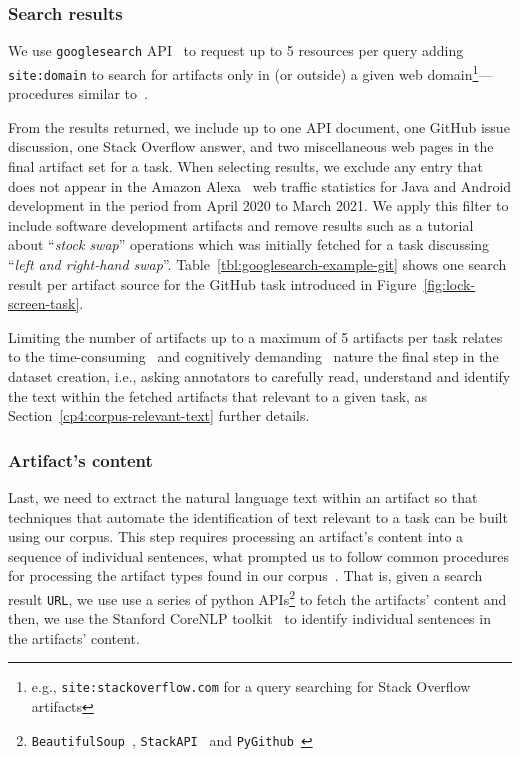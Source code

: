 \subsubsection{Search results}


We use \texttt{googlesearch} API~\cite{googlesearch} to 
request up to 5 resources per query
adding \texttt{site:domain} to search for artifacts 
only in (or outside) a given web domain\footnote{e.g., \texttt{site:stackoverflow.com} for a query searching for Stack Overflow artifacts}---procedures similar to~\cite{Xu2017}.



From the results returned, we include up to
one API document, one GitHub issue discussion, one Stack Overflow answer, and two miscellaneous web pages
in the final artifact set for a task. 
When selecting results, we exclude any entry that does not appear in the Amazon Alexa~\cite{alexa} web traffic statistics for Java and Android development in the period from April 2020 to March 2021. 
We apply this filter to include software development artifacts and remove results 
such as a tutorial about  ``\textit{stock swap}'' operations which was initially fetched 
for a task discussing ``\textit{left and right-hand swap}''.
Table~\ref{tbl:googlesearch-example-git} shows one search result per artifact source for the GitHub task introduced in Figure~\ref{fig:lock-screen-task}.


Limiting the number of artifacts up to a maximum of 5 artifacts per task relates to the
time-consuming~\cite{al2017} and cognitively demanding~\cite{Piorkowski2016} 
nature the final step in the dataset creation, i.e.,  
asking annotators to carefully read, understand and identify the text
within the fetched artifacts that relevant to a given task,
as Section~\ref{cp4:corpus-relevant-text} further details.







\subsubsection{Artifact's content}

Last, we need to extract the natural language text within an artifact so that 
techniques that automate the identification of text relevant to a task can be built 
using our corpus.  This step requires processing an artifact's content 
into a sequence of individual sentences,
what prompted us to follow common procedures for processing the artifact types found in our corpus~\cite{Arya2019, nadi2020}.
That is, given a search result \texttt{URL}, we use use a series of python 
APIs\footnote{\texttt{BeautifulSoup}~\cite{beautifulsoup4},
\texttt{StackAPI}~\cite{StackAPI} and \texttt{PyGithub}~\cite{PyGithub}}
to fetch the artifacts' content
and then, we use the Stanford CoreNLP toolkit~\cite{CoreNLP} to identify 
individual sentences in the artifacts' content.







